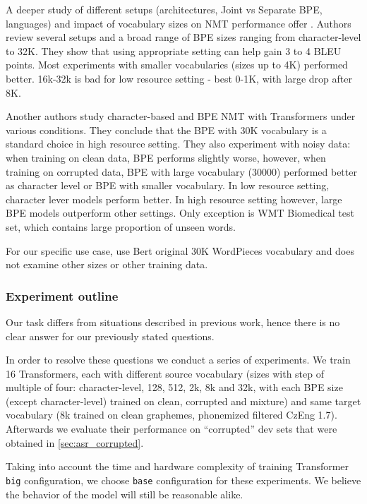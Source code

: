 A deeper study of different setups (architectures, Joint vs Separate BPE, languages) and impact of vocabulary sizes on NMT performance offer . Authors review several setups and a broad range of BPE sizes ranging from character-level to 32K. They show that using appropriate setting can help gain 3 to 4 BLEU points. Most experiments with smaller vocabularies (sizes up to 4K) performed better. 
16k-32k is bad for low resource setting - best 0-1K, with large drop after 8K.


Another authors  study character-based and BPE NMT with Transformers under various conditions. They conclude that the BPE with 30K vocabulary is a standard choice in high resource setting. They also experiment with noisy data: when training on clean data, BPE performs slightly worse, however, when training on corrupted data, BPE with large vocabulary (30000) performed better as character level or BPE with smaller vocabulary. In low resource setting, character lever models perform better. In high resource setting however, large BPE models outperform other settings. Only exception is WMT Biomedical test set, which contains large proportion of unseen words.

For our specific use case,  use Bert  original 30K WordPieces vocabulary and does not examine other sizes or other training data.

\subsubsection{Experiment outline}
Our task differs from situations described in previous work, hence there is no clear answer for our previously stated questions.

In order to resolve these questions we conduct a series of experiments. We train 16 Transformers, each with different source vocabulary (sizes with step of multiple of four: character-level, 128, 512, 2k, 8k and 32k, with each BPE size (except character-level) trained on clean, corrupted and mixture) and same target vocabulary (8k trained on clean graphemes, phonemized filtered CzEng 1.7). Afterwards we evaluate their performance on ``corrupted'' dev sets that were obtained in \cref{sec:asr_corrupted}.

Taking into account the time and hardware complexity of training Transformer \texttt{big} configuration, we choose \texttt{base}  configuration for these experiments. We believe the behavior of the model will still be reasonable alike.

